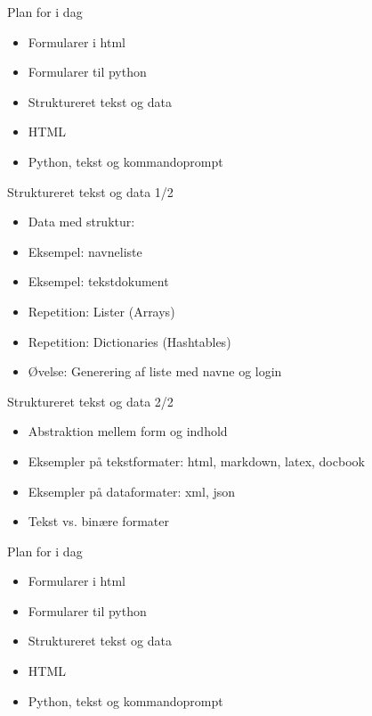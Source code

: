 \documentclass[a4paper,landscape]{slides}
\begin{document}
\begin{slide}
	\begin{center} {\large 
            Plan for i dag
	} \end{center}
	\begin{itemize} \addtolength{\itemsep}{-\baselineskip}
		\item Formularer i html
		\item Formularer til python
		\item Struktureret tekst og data
		\item HTML
		\item Python, tekst og kommandoprompt
	\end{itemize}
\end{slide}

\begin{slide}
	\begin{center} {\large 
            Struktureret tekst og data 1/2
	} \end{center}
	\begin{itemize} \addtolength{\itemsep}{-\baselineskip}
            \item Data med struktur: 
            \item Eksempel: navneliste
            \item Eksempel: tekstdokument
            \item Repetition: Lister (Arrays)
            \item Repetition: Dictionaries (Hashtables)
            \item Øvelse: Generering af liste med navne og login
	\end{itemize}
\end{slide}

\begin{slide}
	\begin{center} {\large 
            Struktureret tekst og data 2/2
	} \end{center}
	\begin{itemize} \addtolength{\itemsep}{-\baselineskip}
		\item Abstraktion mellem form og indhold
		\item Eksempler på tekstformater: html, markdown, latex, docbook
		\item Eksempler på dataformater: xml, json
		\item Tekst vs. binære formater
	\end{itemize}
\end{slide}

\begin{slide}
	\begin{center} {\large 
            Plan for i dag
	} \end{center}
	\begin{itemize} \addtolength{\itemsep}{-\baselineskip}
		\item Formularer i html
		\item Formularer til python
		\item Struktureret tekst og data
		\item HTML
		\item Python, tekst og kommandoprompt
	\end{itemize}
\end{slide}
\end{document}
